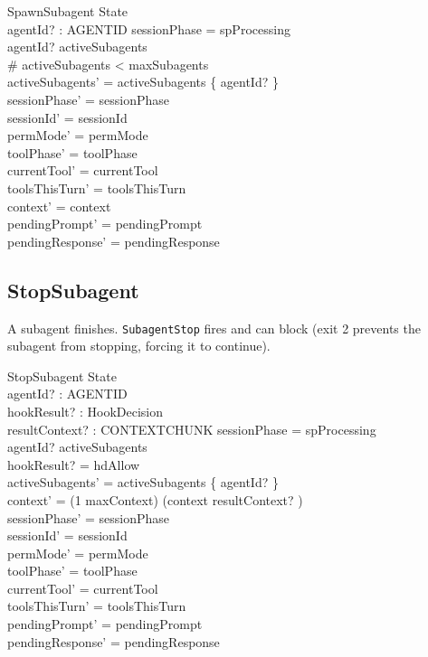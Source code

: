 \documentclass[a4paper,10pt,fleqn]{article}
\begin{document}
\begin{schema}{SpawnSubagent}
  \Delta State \\
  agentId? : AGENTID
  \where
  sessionPhase = spProcessing \\
  agentId? \notin activeSubagents \\
  \# activeSubagents < maxSubagents \\
  activeSubagents' = activeSubagents \cup \{ agentId? \} \\
  sessionPhase' = sessionPhase \\
  sessionId' = sessionId \\
  permMode' = permMode \\
  toolPhase' = toolPhase \\
  currentTool' = currentTool \\
  toolsThisTurn' = toolsThisTurn \\
  context' = context \\
  pendingPrompt' = pendingPrompt \\
  pendingResponse' = pendingResponse
\end{schema}

\subsection{StopSubagent}

A subagent finishes. \texttt{SubagentStop} fires and can block (exit 2
prevents the subagent from stopping, forcing it to continue).

\begin{schema}{StopSubagent}
  \Delta State \\
  agentId? : AGENTID \\
  hookResult? : HookDecision \\
  resultContext? : CONTEXTCHUNK
  \where
  sessionPhase = spProcessing \\
  agentId? \in activeSubagents \\
  hookResult? = hdAllow \\
  activeSubagents' = activeSubagents \setminus \{ agentId? \} \\
  context' = (1 \upto maxContext) \dres (context \cat \langle resultContext? \rangle) \\
  sessionPhase' = sessionPhase \\
  sessionId' = sessionId \\
  permMode' = permMode \\
  toolPhase' = toolPhase \\
  currentTool' = currentTool \\
  toolsThisTurn' = toolsThisTurn \\
  pendingPrompt' = pendingPrompt \\
  pendingResponse' = pendingResponse
\end{schema}
\end{document}
